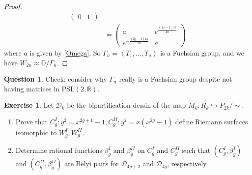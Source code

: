 \documentclass[reqno]{amsart}
\theoremstyle{definition}
\newtheorem{exercise}[theorem]{Exercise}
\newtheorem{question}[theorem]{Question}
\theoremstyle{remark}
\newcommand{\PSL}{\mathrm{PSL}}
\begin{document}
\begin{proof}
\begin{align*}
\begin{pmatrix}
                0 & 1 \end{pmatrix} \\
            &= \begin{pmatrix} a & e^{\frac{(2j-1) i \pi}{2n}}\\
                e^{- \frac{(2j-1) i \pi}{2n}} & a
            \end{pmatrix} 
        \end{align*}
        where $a$ is given by \eqref{Omega}.
        So $\Gamma_n = \left< T_1, \ldots, T_n \right>$ is a Fuchsian group,
        and
        we have
        $W_{2n} \approx \mathbb{D} / \Gamma_n$.
    \end{proof}

    \begin{question}
        Check: consider why $\Gamma_n$ really is a Fuchsian group despite not having matrices in $\PSL(2,\mathbb{R})$.
    \end{question}


    \begin{exercise}
        Let $\mathcal{D}_k$ be the bipartification dessin of the map $M_k \colon R_k \hookrightarrow P_{2k} / \sim$.
        \begin{enumerate}
            \item Prove that
            $C_g^I \colon y^2 = x^{2g+1} -1, C_g^{II} \colon y^2 = x (x^{2g} -1)$ define Riemann surfaces isomorphic to
            $W_g^I, W_g^{II}$.
            \item 
            Determine rational functions $\beta_g^I$ and
            $\beta_g^{II}$ on
            $C_g^I$ and
            $C_g^{II}$ such that $(C_g^I, \beta_g^I)$ and
            $(C_g^{II}, \beta_g^{II})$ are Belyi pairs for $\mathcal{D}_{4g+2}$ and
            $\mathcal{D}_{4g}$, respectively.
        \end{enumerate}
    \end{exercise}
\end{document}
